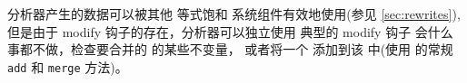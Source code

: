 \eclass 分析器产生的数据可以被其他 等式饱和 系统组件有效地使用(参见 \autoref{sec:rewrites}),
但是由于 \textsf{modify} 钩子的存在，\eclass 分析器可以独立使用
典型的 \textsf{modify} 钩子 会什么事都不做，检查要合并的 \eclasses 的某些不变量，
或者将一个 \enode 添加到该 \eclass 中(使用 \egraph 的常规 \texttt{add} 和 \texttt{merge} 方法)。

